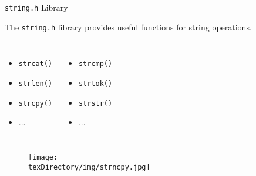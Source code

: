 \documentclass[compress]{beamer}
\begin{document}
\begin{slide}
	\begin{block}{\texttt{string.h} Library}
	
	The \texttt{string.h} library provides useful functions for string operations.

	\begin{columns}
	\begin{itemize}
	\item[] \texttt{strcat()}
	\item[] \texttt{strlen()}
	\item[] \texttt{strcpy()}
	\item[] ...
	\end{itemize}
	\begin{itemize}
	\item[] \texttt{strcmp()}
	\item[] \texttt{strtok()}
	\item[] \texttt{strstr()}
	\item[] ...
	\end{itemize}
	\end{columns}

	\end{block}
\end{slide}

\begin{slide}
	\begin{figure}
	\texttt{[image: \\texDirectory/img/strncpy.jpg]}
	\end{figure}
\end{slide}
\end{document}
